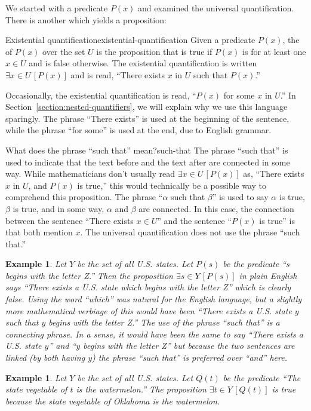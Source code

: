 \documentclass{book}
\newcounter{ekcounter}%
\theoremstyle{ekimcustom}
\newtheorem{example}[ekcounter]{Example}
\newcommand\defn[1]{{\color{blue}{\bf #1}}}
\begin{document}
We started with a predicate $P(x)$ and examined the universal quantification. There is another \defn{quantifier} which yields a proposition:
\begin{bdefinition}{Existential quantification}{existential-quantification}
Given a predicate $P(x)$, the \defn{existential quantification} of $P(x)$ over the set $U$ is the proposition that is true if $P(x)$ is for at least one $x \in U$ and is false otherwise. The existential quantification is written $\exists x \in U\,[P(x)]$ and is read, ``There exists $x$ in $U$ such that $P(x)$.''
\end{bdefinition}
Occasionally, the existential quantification is read, ``$P(x)$ for some $x$ in $U$.'' In Section~\ref{section:nested-quantifiers}, we will explain why we use this language sparingly. The phrase ``There exists'' is used at the beginning of the sentence, while the phrase ``for some'' is used at the end, due to English grammar.
\begin{blanguage}{What does the phrase ``such that'' mean?}{such-that}
The phrase ``such that'' is used to indicate that the text before and the text after are connected in some way. While mathematicians don't usually read $\exists x \in U\,[P(x)]$ as, ``There exists $x$ in $U$, and $P(x)$ is true,'' this would technically be a possible way to comprehend this proposition. The phrase ``$\alpha$ such that $\beta$'' is used to say $\alpha$ is true, $\beta$ is true, and in some way, $\alpha$ and $\beta$ are connected. In this case, the connection between the sentence ``There exists $x \in U$'' and the sentence ``$P(x)$ is true'' is that both mention $x$. The universal quantification does not use the phrase ``such that.''
\end{blanguage}
\begin{example}
Let $Y$ be the set of all U.S. states. Let $P(s)$ be the predicate ``$s$ begins with the letter Z.'' Then the proposition $\exists s \in Y\,[P(s)]$ in plain English says ``There exists a U.S. state which begins with the letter Z'' which is clearly false. Using the word ``which'' was natural for the English language, but a slightly more mathematical verbiage of this would have been ``There exists a U.S. state $y$ such that $y$ begins with the letter Z.'' The use of the phrase ``such that'' is a connecting phrase. In a sense, it would have been the same to say ``There exists a U.S. state $y$'' and ``$y$ begins with the letter Z'' but because the two sentences are linked (by both having $y$) the phrase ``such that'' is preferred over ``and'' here.
\end{example}
\begin{example}
Let $Y$ be the set of all U.S. states. Let $Q(t)$ be the predicate ``The state vegetable of $t$ is the watermelon.'' The proposition $\exists t \in Y\,[Q(t)]$ is true because the state vegetable of Oklahoma is the watermelon.
\end{example}
\end{document}
